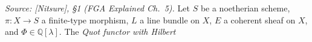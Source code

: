 \begin{definition}
  \label{def:quot_functor}

  \textit{Source: [Nitsure], \S 1 (FGA Explained Ch.~5).}
  Let \(S\) be a noetherian scheme, \(\pi : X \to S\) a finite-type morphism,
  \(L\) a line bundle on \(X\), \(E\) a coherent sheaf on \(X\), and
  \(\Phi \in \mathbb{Q}[\lambda]\). The \emph{Quot functor with Hilbert
}
\end{definition}
